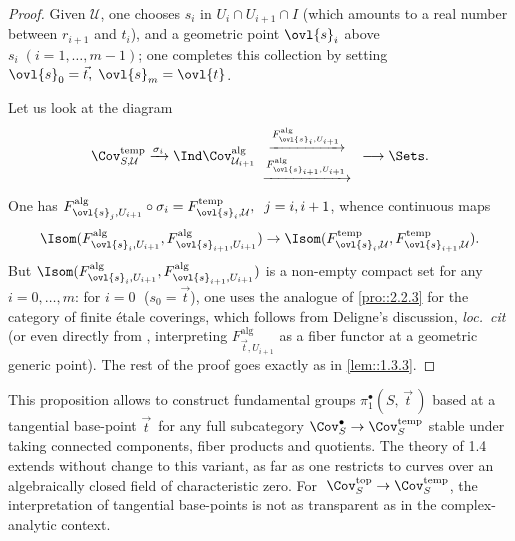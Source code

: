 \begin{proof}
 Given $\mathcal{U}$, one chooses $s_i$ in $U_i\cap U_{i+1}\cap I$ (which
 amounts to a real number between $r_{i+1}$ 
 and $t_i$), and a geometric point $\ovl{s}_i$ above $s_i\; (i=1,\ldots,
 m-1)$; one completes this collection by setting 
 $\ovl{s}_0=\vec t,\; \ovl{s}_m=\ovl{t}$. 

 Let us look at the diagram 
 \begin{equation*}
  \Cov^{\mathrm{temp}}_{S,\mathcal{U}}
   \xrightarrow{\sigma_i}
   \Ind\Cov^{\mathrm{alg}}_{\mathcal{U}_{i+1}}
   \begin{array}{c}
    \xrightarrow{F^{\mathrm{alg}}_{\ovl{s}_i, U_{i+1}}}\\
    \xrightarrow{F^{\mathrm{alg}}_{\ovl{s}_{i+1}, U_{i+1}}}\\
   \end{array}
   \longrightarrow \Sets.
 \end{equation*}               
 One has $F^{\mathrm{alg}}_{\ovl{s}_j, U_{i+1}}\circ \sigma_i =
 F^{\mathrm{temp}}_{\ovl{s}_i, \mathcal{U} },\;\;j=i,i+1$, whence
 continuous maps 
 \begin{equation*}
  \Isom(F^{\mathrm{alg}}_{\ovl{s}_i,
   U_{i+1}},F^{\mathrm{alg}}_{\ovl{s}_{i+1}, 
   U_{i+1}})\to \Isom(F^{\mathrm{temp}}_{\ovl{s}_i,
   \mathcal{U}},F^{\mathrm{temp}}_{\ovl{s}_{i+1}, \mathcal{U}}).
 \end{equation*} 
 But $\Isom(F^{\mathrm{alg}}_{\ovl{s}_i,
 U_{i+1}},F^{\mathrm{alg}}_{\ovl{s}_{i+1}, U_{i+1}})$ is a non-empty
 compact set for any $i=0,\ldots, m$: for $i=0\;$ ($s_0=\vec t$), one
 uses the analogue of \ref{pro::2.2.3} for the category of finite \'etale
 coverings, which follows from Deligne's discussion, {\it loc.~cit} (or
 even directly from \cite[V]{sga1}, interpreting
 $F^{\mathrm{alg}}_{\vec t, U_{i+1}}$ as a fiber functor at a geometric
 generic point). The rest of the proof goes exactly as in \ref{lem::1.3.3}.
\end{proof}

\begin{para}\label{para::2.2.4} This proposition allows to construct
 fundamental groups $\pi_1^\bullet(S,\,\vec t\,)$ based at a tangential
base-point $\vec t\,$ for any full subcategory $\Cov^\bullet_S\to
\Cov^{\mathrm{temp}}_S$ stable under taking connected components, fiber
products and quotients.  The theory of 1.4 extends without change to this
variant, as far as one restricts to curves over an algebraically closed
field of characteristic zero. For $\;\Cov^{\mathrm{top}}_S\to
\Cov^{\mathrm{temp}}_S$, the interpretation of tangential base-points is
not as transparent as in the complex-analytic context.
\end{para}


